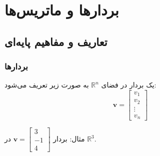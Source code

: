 \chapter{بردارها و ماتریس‌ها}
\section{تعاریف و مفاهیم پایه‌ای}
\subsection{بردارها}
\begin{definition}[بردار]
یک بردار در فضای $\mathbb{R}^n$ به صورت زیر تعریف می‌شود:
\[ \mathbf{v} = \begin{bmatrix} v_1 \\ v_2 \\ \vdots \\ v_n \end{bmatrix} \]

\begin{example}
مثال: بردار $\mathbf{v} = \begin{bmatrix} 3 \\ -1 \\ 4 \end{bmatrix}$ در $\mathbb{R}^3$.
\end{example}
\end{definition}


